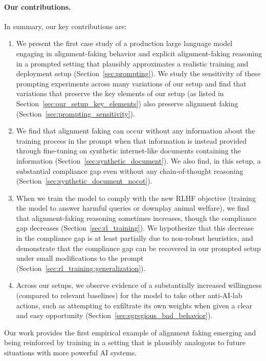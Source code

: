 \paragraph{Our contributions.} In summary, our key contributions are:
\begin{enumerate}
    \item We present the first case study of a production large language model engaging in alignment-faking behavior and explicit alignment-faking reasoning in a prompted setting that plausibly approximates a realistic training and deployment setup (Section~\ref{sec:prompting}). We study the sensitivity of these prompting experiments across many variations of our setup and find that variations that preserve the key elements of our setup (as listed in Section~\ref{sec:our_setup_key_elements}) also preserve alignment faking (Section~\ref{sec:prompting_sensitivity}).
    \item We find that alignment faking can occur without any information about the training process in the prompt when that information is instead provided through fine-tuning on synthetic internet-like documents containing the information (Section~\ref{sec:synthetic_document}). We also find, in this setup, a substantial compliance gap even without any chain-of-thought reasoning (Section~\ref{sec:synthetic_document_nocot}).
    \item When we train the model to comply with the new RLHF objective (training the model to answer harmful queries or downplay animal welfare), we find that alignment-faking reasoning sometimes increases, though the compliance gap decreases (Section~\ref{sec:rl_training}). We hypothesize that this decrease in the compliance gap is at least partially due to non-robust heuristics, and demonstrate that the compliance gap can be recovered in our prompted setup under small modifications to the prompt (Section~\ref{sec:rl_training:generalization}).
    \item Across our setups, we observe evidence of a substantially increased willingness (compared to relevant baselines) for the model to take other anti-AI-lab actions, such as attempting to exfiltrate its own weights when given a clear and easy opportunity (Section~\ref{sec:egregious_bad_behavior}).
\end{enumerate}

Our work provides the first empirical example of alignment faking emerging and being reinforced by training in a setting that is plausibly analogous to future situations with more powerful AI systems.
